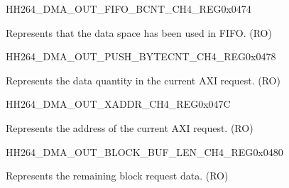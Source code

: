 \begin{register}{H}{H264\_DMA\_OUT\_FIFO\_BCNT\_CH4\_REG}{0x0474}\label{regdesc:H264DMAOUTFIFOBCNTCH4REG}
%
%
\regnewline%
\begin{regdesc}\begin{reglist}
\label{fielddesc:H264DMAOUTCMDFIFOOUTFIFOBCNTCH4}\item [H264\_DMA\_OUT\_CMDFIFO\_OUTFIFO\_BCNT\_CH4] Represents that the data space has been used in FIFO. (RO)
\end{reglist}\end{regdesc}
\end{register}


\begin{register}{H}{H264\_DMA\_OUT\_PUSH\_BYTECNT\_CH4\_REG}{0x0478}\label{regdesc:H264DMAOUTPUSHBYTECNTCH4REG}
%
%
\regnewline%
\begin{regdesc}\begin{reglist}
\label{fielddesc:H264DMAOUTCMDFIFOPUSHBYTECNTCH4}\item [H264\_DMA\_OUT\_CMDFIFO\_PUSH\_BYTECNT\_CH4] Represents the data quantity in the current AXI request. (RO)
\end{reglist}\end{regdesc}
\end{register}


\begin{register}{H}{H264\_DMA\_OUT\_XADDR\_CH4\_REG}{0x047C}\label{regdesc:H264DMAOUTXADDRCH4REG}
%
\regnewline%
\begin{regdesc}\begin{reglist}
\label{fielddesc:H264DMAOUTCMDFIFOXADDRCH4}\item [H264\_DMA\_OUT\_CMDFIFO\_XADDR\_CH4] Represents the address of the current AXI request. (RO)
\end{reglist}\end{regdesc}
\end{register}


\begin{register}{H}{H264\_DMA\_OUT\_BLOCK\_BUF\_LEN\_CH4\_REG}{0x0480}\label{regdesc:H264DMAOUTBLOCKBUFLENCH4REG}
%
%
\regnewline%
\begin{regdesc}\begin{reglist}
\label{fielddesc:H264DMAOUTBLOCKBUFLENCH4}\item [H264\_DMA\_OUT\_BLOCK\_BUF\_LEN\_CH4] Represents the remaining block request data. (RO)
\end{reglist}\end{regdesc}
\end{register}

